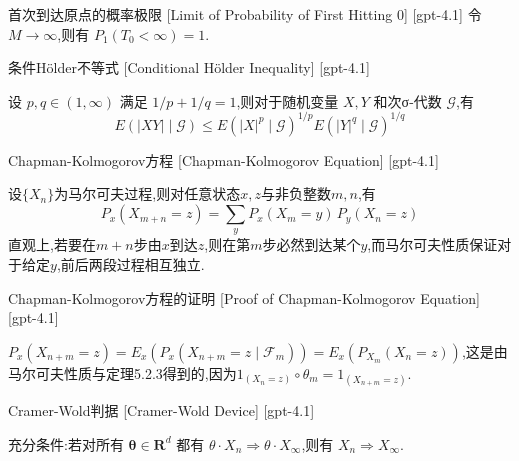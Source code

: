 \documentclass[UTF8]{ctexart}
\begin{document}
    
    
    \begin{crl}
        {首次到达原点的概率极限}
        [Limit of Probability of First Hitting 0]
        [gpt-4.1]
        令 $M \to \infty$,则有 $P_{1}(T_{0} < \infty) = 1$.
    \end{crl}
    
    
    
    \begin{thm}
        {条件Hölder不等式}
        [Conditional Hölder Inequality]
        [gpt-4.1]
        
设 $p, q \in (1, \infty)$ 满足 $1/p + 1/q = 1$,则对于随机变量 $X, Y$ 和次σ-代数 $\mathcal{G}$,有
\[
E(|XY| \mid \mathcal{G}) \leq E(|X|^p \mid \mathcal{G})^{1/p} E(|Y|^q \mid \mathcal{G})^{1/q}
\]

    \end{thm}
    
    
    
    \begin{thm}
        {Chapman-Kolmogorov方程}
        [Chapman-Kolmogorov Equation]
        [gpt-4.1]
        
设$\{X_n\}$为马尔可夫过程,则对任意状态$x,z$与非负整数$m,n$,有
\[
P_{x}(X_{m+n}=z) = \sum_{y} P_{x}(X_{m}=y)\, P_{y}(X_{n}=z)
\]
直观上,若要在$m+n$步由$x$到达$z$,则在第$m$步必然到达某个$y$,而马尔可夫性质保证对于给定$y$,前后两段过程相互独立.

    \end{thm}
    
    
    
    \begin{prf}
        {Chapman-Kolmogorov方程的证明}
        [Proof of Chapman-Kolmogorov Equation]
        [gpt-4.1]
        
$P_{x}(X_{n+m}=z) = E_{x}(P_{x}(X_{n+m}=z \mid \mathcal{F}_m)) = E_{x}(P_{X_{m}}(X_{n}=z))$,这是由马尔可夫性质与定理5.2.3得到的,因为$1_{(X_{n}=z)} \circ \theta_{m} = 1_{(X_{n+m}=z)}$.

    \end{prf}
    
    
    
    \begin{thm}
        {Cramer-Wold判据}
        [Cramer-Wold Device]
        [gpt-4.1]
        
充分条件:若对所有 $\boldsymbol{\theta} \in \mathbf{R}^d$ 都有 $\theta \cdot X_n \Rightarrow \theta \cdot X_\infty$,则有 $X_n \Rightarrow X_\infty$.

    \end{thm}
    
\end{document}
